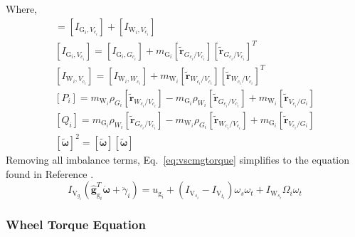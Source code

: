 Where,
\begin{gather}
[I_{\text{V}_i,V_{c_i}}] = [I_{\text{G}_i,V_{c_i}}] + [I_{\text{W}_i,V_{c_i}}]
\\
[I_{\text{G}_i,V_{c_i}}] = [I_{\text{G}_i,G_{c_i}}] + m_{\text{G}_i}[\tilde{\bm{r}}_{G_{c_i}/V_{c_i}}][\tilde{\bm{r}}_{G_{c_i}/V_{c_i}}]^T
\\
[I_{\text{W}_i,V_{c_i}}] = [I_{\text{W}_i,W_{c_i}}] + m_{\text{W}_i}[\tilde{\bm{r}}_{W_{c_i}/V_{c_i}}][\tilde{\bm{r}}_{W_{c_i}/V_{c_i}}]^T
\\
[P_i] = m_{\text{W}_i}\rho_{G_i}[\tilde{\bm{r}}_{W_{c_i}/V_{c_i}}] - m_{\text{G}_i}\rho_{W_i}[\tilde{\bm{r}}_{G_{c_i}/V_{c_i}}] + m_{\text{W}_i}[\tilde{\bm r}_{V_{c_i}/G_i}]
\\
[Q_i] = m_{\text{G}_i}\rho_{W_i}[\tilde{\bm{r}}_{G_{c_i}/V_{c_i}}] - m_{\text{W}_i}\rho_{G_i}[\tilde{\bm{r}}_{W_{c_i}/V_{c_i}}] + m_{\text{G}_i}[\tilde{\bm r}_{V_{c_i}/G_i}]
\\
[\tilde{\bm\omega}]^2 = [\tilde{\bm\omega}][\tilde{\bm\omega}]
\end{gather}
Removing all imbalance terms, Eq.~\eqref{eq:vscmgtorque} simplifies to the equation found in Reference \cite{schaub}.
\begin{equation}
I_{\text{V}_{g_i}}(\hat{\bm g}_{\text{g}_i}^T\dot{\bm{\omega}}
+  \ddot{\gamma}_i)
 = u_{\text{g}_i} + (I_{\text{V}_{s_i}}-I_{\text{V}_{t_i}})\omega_s\omega_t + I_{\text{W}_{s_i}}\Omega_i\omega_t
\label{eq:vscmgGimbalTorqueSimple}
\end{equation}

\subsubsection{Wheel Torque Equation}


